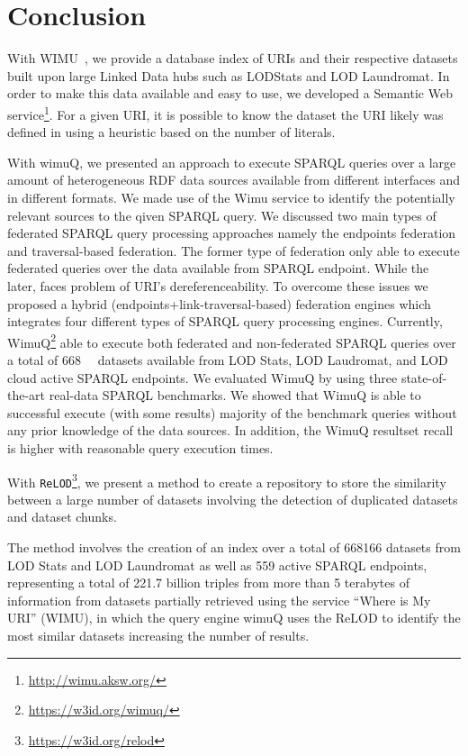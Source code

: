 \documentclass[sw]{iosart2x}
\begin{document}
\section{Conclusion}
\label{sec:conc}

With WIMU~\cite{valdestilhas2018my}, we provide a database index of URIs and their respective datasets built upon large Linked Data hubs such as LODStats and LOD Laundromat.
In order to make this data available and easy to use, we developed a Semantic Web service\footnote{\url{http://wimu.aksw.org/}}.
For a given URI, it is possible to know the dataset the URI likely was defined in using a heuristic based on the number of literals.

With wimuQ\cite{valdestilhas2019more}, we presented an approach to execute SPARQL queries over a large amount of heterogeneous RDF data sources available from different interfaces and in different formats. We made use of the Wimu service to identify the potentially relevant sources to the qiven SPARQL query. We discussed two main types of federated SPARQL query processing approaches namely the endpoints federation and traversal-based federation. The former type of federation only able to execute federated queries over the data available from SPARQL endpoint. While the later, faces problem of URI's dereferenceability. To overcome these issues we proposed a hybrid (endpoints+link-traversal-based) federation engines which integrates four different types of SPARQL query processing engines. Currently, WimuQ\footnote{\url{https://w3id.org/wimuq/}} able to execute both federated and non-federated SPARQL queries over a total of \SI{668}{\kilo\nothing} datasets available from LOD Stats, LOD Laudromat, and LOD cloud active SPARQL endpoints. We evaluated WimuQ by using three state-of-the-art real-data SPARQL benchmarks. We showed that WimuQ is able to successful execute (with some results) majority of the benchmark queries without any prior knowledge of the data sources. In addition, the WimuQ resultset recall is higher with reasonable query execution times. 

With \texttt{ReLOD}\footnote{\url{https://w3id.org/relod}}, we present a method to create a repository to store the similarity between a large number of datasets involving the detection of duplicated datasets and dataset chunks.

The method involves the creation of an index over a total of \num{668166} datasets from LOD Stats and LOD Laundromat as well as 559 active SPARQL endpoints, representing a total of 221.7 billion triples from more than 5 terabytes of information from datasets partially retrieved using the service ``Where is My URI'' (WIMU)\cite{valdestilhas2018my}, in which the query engine wimuQ\cite{valdestilhas2019more} uses the ReLOD to identify the most similar datasets increasing the number of results. 
\end{document}
